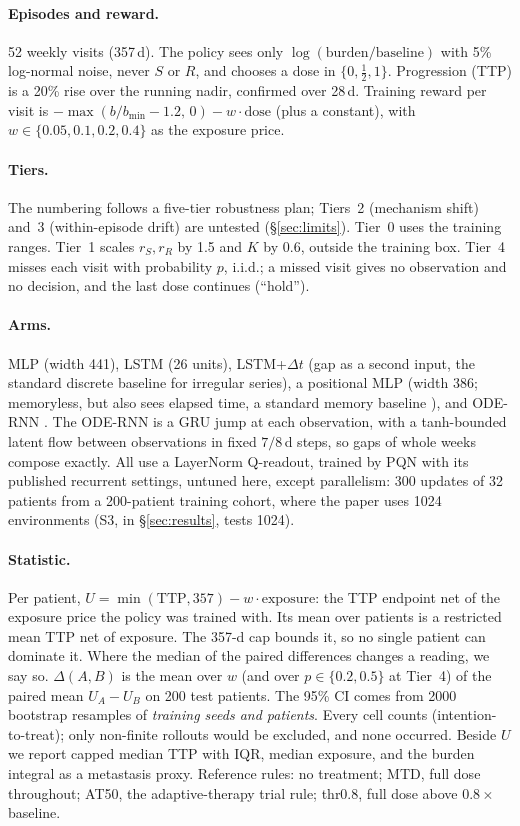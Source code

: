\documentclass[10pt]{article}
\renewcommand{\cite}{\citep}  %
\begin{document}
\paragraph{Episodes and reward.} 52 weekly visits (357\,d). The policy sees
only $\log(\text{burden}/\text{baseline})$ with 5\% log-normal noise, never $S$
or $R$, and chooses a dose in $\{0, \tfrac12, 1\}$. Progression (TTP) is a 20\%
rise over the running nadir, confirmed over 28\,d. Training reward per visit is
$-\max(b/b_{\min}-1.2,\,0) - w\cdot\text{dose}$ (plus a constant), with
$w\in\{0.05,0.1,0.2,0.4\}$ as the exposure price. %
\paragraph{Tiers.} The numbering follows a five-tier robustness plan; Tiers~2
(mechanism shift) and~3 (within-episode drift) are untested
(\S\ref{sec:limits}). Tier~0 uses the training ranges. Tier~1 scales $r_S, r_R$
by 1.5 and $K$ by 0.6, outside the training box. Tier~4 misses each visit with
probability $p$, i.i.d.; a missed visit gives no observation and no decision,
and the last dose continues (``hold'').
\paragraph{Arms.} MLP (width 441), LSTM (26 units), LSTM+$\Delta t$ (gap as a
second input, the standard discrete baseline for irregular series), a
positional MLP (width 386; memoryless, but also sees elapsed time, a standard
memory baseline \cite{morad2023}), and ODE-RNN
\cite{rubanova2019}. The ODE-RNN is a GRU jump at each observation, with a
tanh-bounded latent flow between observations in fixed $7/8$\,d steps, so gaps
of whole weeks compose exactly. All use a LayerNorm Q-readout, trained by PQN
\cite{gallici2024} with its published recurrent settings, untuned here, except
parallelism: 300 updates of 32 patients from a 200-patient training cohort,
where the paper uses 1024 environments (S3, in \S\ref{sec:results}, tests 1024).
\paragraph{Statistic.} Per patient, $U=\min(\mathrm{TTP},357)-w\cdot\text{exposure}$:
the TTP endpoint net of the exposure price the policy was trained with. Its
mean over patients is a restricted mean TTP net of exposure. The 357-d cap
bounds it, so no single patient can dominate it. Where the median of the paired
differences changes a reading, we say so.
$\Delta(A,B)$ is the mean over $w$ (and over $p\in\{0.2,0.5\}$ at Tier~4) of
the paired mean $U_A-U_B$ on 200 test patients. The 95\% CI comes from 2000
bootstrap resamples of \emph{training seeds and patients}. Every cell counts
(intention-to-treat); only non-finite rollouts would be excluded, and none
occurred. Beside $U$ we report capped median TTP with IQR, median exposure,
and the burden integral as a metastasis proxy. Reference rules: no treatment;
MTD, full dose throughout; AT50, the adaptive-therapy trial rule; thr0.8, full
dose above $0.8\times$ baseline.
\end{document}
